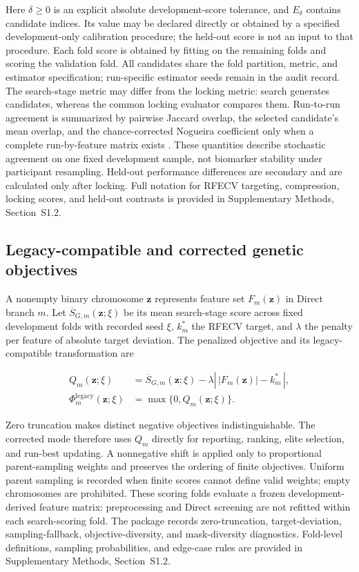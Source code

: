 Here $\delta\geq0$ is an explicit absolute development-score tolerance, and $E_\delta$ contains candidate indices. Its value may be declared directly or obtained by a specified development-only calibration procedure; the held-out score is not an input to that procedure. Each fold score is obtained by fitting on the remaining folds and scoring the validation fold. All candidates share the fold partition, metric, and estimator specification; run-specific estimator seeds remain in the audit record. The search-stage metric may differ from the locking metric: search generates candidates, whereas the common locking evaluator compares them. Run-to-run agreement is summarized by pairwise Jaccard overlap, the selected candidate's mean overlap, and the chance-corrected Nogueira coefficient only when a complete run-by-feature matrix exists \citep{ref36}. These quantities describe stochastic agreement on one fixed development sample, not biomarker stability under participant resampling. Held-out performance differences are secondary and are calculated only after locking. Full notation for RFECV targeting, compression, locking scores, and held-out contrasts is provided in Supplementary Methods, Section~S1.2.

\subsection{Legacy-compatible and corrected genetic objectives}

A nonempty binary chromosome $\mathbf z$ represents feature set $F_m(\mathbf z)$ in Direct branch $m$. Let $\overline S_{G,m}(\mathbf z;\xi)$ be its mean search-stage score across fixed development folds with recorded seed $\xi$, $k_m^\ast$ the RFECV target, and $\lambda$ the penalty per feature of absolute target deviation. The penalized objective and its legacy-compatible transformation are

\begin{equation}
\begin{aligned}
Q_m(\mathbf z;\xi)&=\overline S_{G,m}(\mathbf z;\xi)-\lambda\left|\,|F_m(\mathbf z)|-k_m^\ast\,\right|,\\
\Phi_m^{\mathrm{legacy}}(\mathbf z;\xi)&=\max\{0,Q_m(\mathbf z;\xi)\}.
\end{aligned}
\label{eq:objective-comparison}
\end{equation}

Zero truncation makes distinct negative objectives indistinguishable. The corrected mode therefore uses $Q_m$ directly for reporting, ranking, elite selection, and run-best updating. A nonnegative shift is applied only to proportional parent-sampling weights and preserves the ordering of finite objectives. Uniform parent sampling is recorded when finite scores cannot define valid weights; empty chromosomes are prohibited. These scoring folds evaluate a frozen development-derived feature matrix: preprocessing and Direct screening are not refitted within each search-scoring fold. The package records zero-truncation, target-deviation, sampling-fallback, objective-diversity, and mask-diversity diagnostics. Fold-level definitions, sampling probabilities, and edge-case rules are provided in Supplementary Methods, Section~S1.2.

